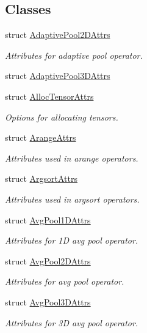 \subsection*{Classes}
\begin{DoxyCompactItemize}
\item 
struct \hyperlink{structtvm_1_1relay_1_1AdaptivePool2DAttrs}{Adaptive\+Pool2\+D\+Attrs}
\begin{DoxyCompactList}\small\item\em Attributes for adaptive pool operator. \end{DoxyCompactList}\item 
struct \hyperlink{structtvm_1_1relay_1_1AdaptivePool3DAttrs}{Adaptive\+Pool3\+D\+Attrs}
\item 
struct \hyperlink{structtvm_1_1relay_1_1AllocTensorAttrs}{Alloc\+Tensor\+Attrs}
\begin{DoxyCompactList}\small\item\em Options for allocating tensors. \end{DoxyCompactList}\item 
struct \hyperlink{structtvm_1_1relay_1_1ArangeAttrs}{Arange\+Attrs}
\begin{DoxyCompactList}\small\item\em Attributes used in arange operators. \end{DoxyCompactList}\item 
struct \hyperlink{structtvm_1_1relay_1_1ArgsortAttrs}{Argsort\+Attrs}
\begin{DoxyCompactList}\small\item\em Attributes used in argsort operators. \end{DoxyCompactList}\item 
struct \hyperlink{structtvm_1_1relay_1_1AvgPool1DAttrs}{Avg\+Pool1\+D\+Attrs}
\begin{DoxyCompactList}\small\item\em Attributes for 1D avg pool operator. \end{DoxyCompactList}\item 
struct \hyperlink{structtvm_1_1relay_1_1AvgPool2DAttrs}{Avg\+Pool2\+D\+Attrs}
\begin{DoxyCompactList}\small\item\em Attributes for avg pool operator. \end{DoxyCompactList}\item 
struct \hyperlink{structtvm_1_1relay_1_1AvgPool3DAttrs}{Avg\+Pool3\+D\+Attrs}
\begin{DoxyCompactList}\small\item\em Attributes for 3D avg pool operator. \end{DoxyCompactList}\item 

\end{DoxyCompactItemize}

